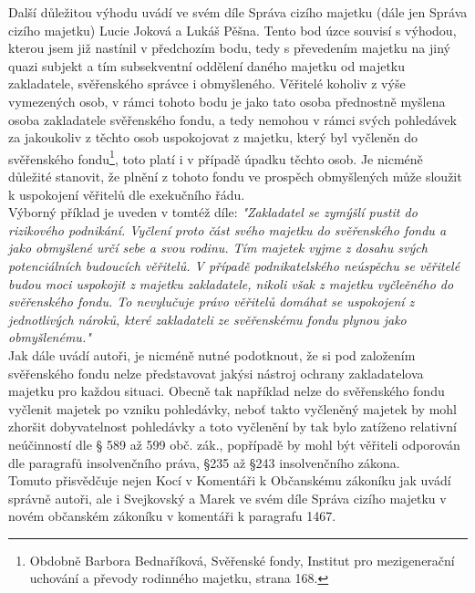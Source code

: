 \documentclass{article}
\begin{document}
 Další důležitou výhodu uvádí ve svém díle Správa cizího majetku (dále jen Správa cizího majetku) Lucie Joková a Lukáš Pěšna. Tento bod úzce souvisí s výhodou, kterou jsem již nastínil v předchozím bodu, tedy s převedením majetku na jiný quazi subjekt a tím subsekventní oddělení daného majetku od majetku zakladatele, svěřenského správce i obmyšleného. Věřitelé koholiv z výše vymezených osob, v rámci tohoto bodu je jako tato osoba přednostně myšlena osoba zakladatele svěřenského fondu, a tedy nemohou v rámci svých pohledávek za jakoukoliv z těchto osob uspokojovat z majetku, který byl vyčleněn do svěřenského fondu\footnote{Obdobně Barbora Bednaříková, Svěřenské fondy, Institut pro mezigenerační uchování a převody rodinného majetku, strana 168.}, toto platí i v případě úpadku těchto osob. Je nicméně důležité stanovit, že plnění z tohoto fondu ve prospěch obmyšlených může sloužit k uspokojení věřitelů dle exekučního řádu.\\
 
 Výborný příklad je uveden v tomtéž díle: \textit{"Zakladatel se zymýšlí pustit do rizikového podnikání. Vyčlení proto část svého majetku do svěřenského fondu a jako obmyšlené určí sebe a svou rodinu. Tím majetek vyjme z dosahu svých potenciálních budoucích věřitelů. V případě podnikatelského neúspěchu se věřitelé budou moci uspokojit z majetku zakladatele, nikoli však z majetku vyčleěného do svěřenského fondu. To nevylučuje právo věřitelů domáhat se uspokojení z jednotlivých nároků, které zakladateli ze svěřenskému fondu plynou jako obmyšlenému."}\\
 
 Jak dále uvádí autoři, je nicméně nutné podotknout, že si pod založením svěřenského fondu nelze představovat jakýsi nástroj ochrany zakladatelova majetku pro každou situaci. Obecně tak například nelze do svěřenského fondu vyčlenit majetek po vzniku pohledávky, neboť takto vyčleněný majetek by mohl zhoršit dobyvatelnost pohledávky a toto vyčlenění by tak bylo zatíženo relativní neúčinností dle § 589 až 599 obč. zák., popřípadě by mohl být věřiteli odporován dle paragrafů insolvenčního práva, §235 až §243 insolvenčního zákona.\\
 
 Tomuto přisvědčuje nejen Kocí v Komentáři k Občanskému zákoníku jak uvádí správně autoři, ale i Svejkovský a Marek ve svém díle Správa cizího majetku v novém občanském zákoníku v komentáři k paragrafu 1467.\\
 
\end{document}
